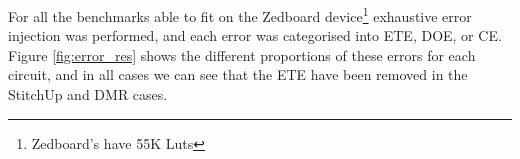 For all the benchmarks able to fit on the Zedboard device\footnote{Zedboard's have 55K Luts}
exhaustive error injection was performed, and each error was categorised into ETE, DOE, or CE.
Figure \ref{fig:error_res} shows the different proportions of these errors for each circuit, and in
all cases we can see that the ETE have been removed in the StitchUp and DMR cases.



